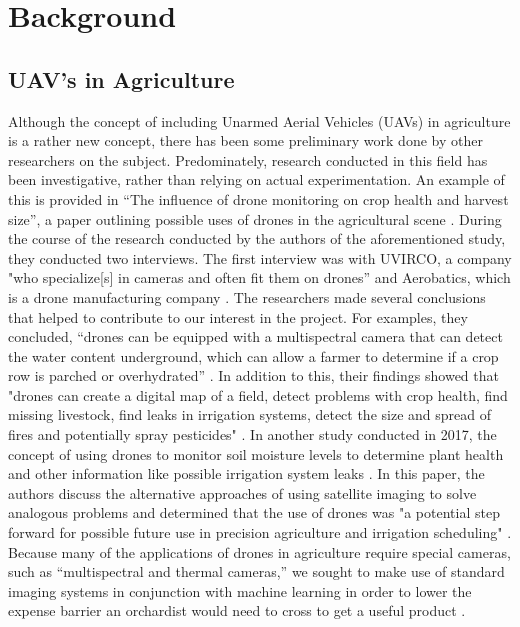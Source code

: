 \section{Background}
\subsection{UAV's in Agriculture}
Although the concept of including Unarmed Aerial Vehicles (UAVs) in agriculture is a rather new concept, there has been some preliminary work done by other researchers on the subject.
Predominately, research conducted in this field has been investigative, rather than relying on actual experimentation.
An example of this is provided in ``The influence of drone monitoring on crop health and harvest size'', a paper outlining possible uses of drones in the agricultural scene \cite{Reinecke2017}.
During the course of the research conducted by the authors of the aforementioned study, they conducted two interviews. 
The first interview was with UVIRCO, a company "who specialize[s] in cameras and often fit them on drones'' and Aerobatics, which is a drone manufacturing company \cite{Reinecke2017}.
The researchers made several conclusions that helped to contribute to our interest in the project.
For examples, they concluded, ``drones can be equipped with a multispectral camera that can detect the water content underground, which can allow a farmer to determine if a crop row is parched or overhydrated'' \cite{Reinecke2017}.
In addition to this, their findings showed that "drones can create a digital map of a field, detect problems with crop health, find missing livestock, find leaks in irrigation systems, detect the size and spread of fires and potentially spray pesticides" \cite{Reinecke2017}.
In another study conducted in 2017, the concept of using drones to monitor soil moisture levels to determine plant health and other information like possible irrigation system leaks \cite{Hassan2017}. In this paper, the authors discuss the alternative approaches of using satellite imaging to solve analogous problems and determined that the use of drones was "a potential step forward for possible future use in precision agriculture and irrigation scheduling" \cite{Hassan2017}.
\\
Because many of the applications of drones in agriculture require special cameras, such as ``multispectral and thermal cameras,'' we sought to make use of standard imaging systems in conjunction with machine learning in order to lower the expense barrier an orchardist would need to cross to get a useful product \cite{Reinecke2017}.